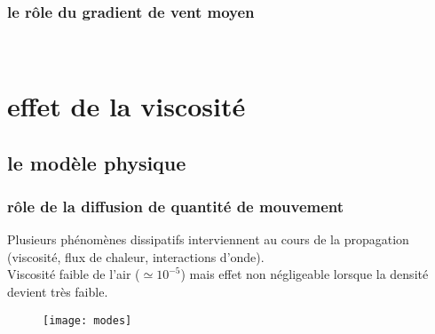 \documentclass[c]{beamer}
\begin{document}
\begin{frame}
\frametitle{le rôle du gradient de vent moyen}
\begin{figure}[!ht]
\centering
{}
\\
\end{figure}
\end{frame}

\section{effet de la viscosité}

\subsection{le modèle physique}

\begin{frame}
\frametitle{rôle de la diffusion de quantité de mouvement}
\begin{minipage}{0.5\textwidth}
\begin{flushleft}
    Plusieurs phénomènes dissipatifs interviennent au cours de la propagation (viscosité, flux de chaleur, interactions d'onde).\\
    Viscosité faible de l'air ($\simeq 10^{-5}$) mais effet non négligeable lorsque la densité devient très faible.\\
\end{flushleft}
\end{minipage}
\begin{minipage}{0.5\textwidth}
\begin{flushright}
    \begin{figure}[!ht]
        \texttt{[image: modes]}
    \end{figure}
\end{flushright}
\end{minipage}
\end{frame}
\end{document}

